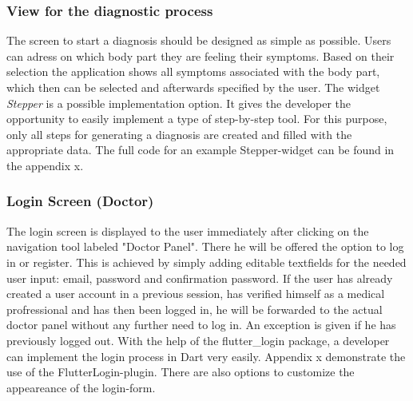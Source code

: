 \subsubsection{\textbf{View for the diagnostic process}}
The screen to start a diagnosis should be designed as simple as possible. Users can adress on which body part they are feeling their symptoms. Based on their selection the application shows all symptoms associated with the body part, which then can be selected and afterwards specified by the user. The widget \textit{Stepper} is a possible implementation option. It gives the developer the opportunity to easily implement a type of step-by-step tool. For this purpose, only all steps for generating a diagnosis are created and filled with the appropriate data. The full code for an example Stepper-widget can be found in the appendix x.

\subsubsection{\textbf{Login Screen (Doctor)}}
The login screen is displayed to the user immediately after clicking on the navigation tool labeled "Doctor Panel". There he will be offered the option to log in or register. This is achieved by simply adding editable textfields for the needed user input: email, password and confirmation password. If the user has already created a user account in a previous session, has verified himself as a medical profressional and has then been logged in, he will be forwarded to the actual doctor panel without any further need to log in. An exception is given if he has previously logged out. With the help of the flutter\_login package, a developer can implement the login process in Dart very easily. Appendix x demonstrate the use of the FlutterLogin-plugin. There are also options to customize the appeareance of the login-form.
